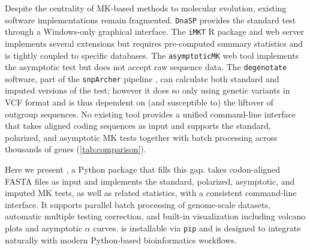 Despite the centrality of MK-based methods to molecular evolution,
existing software implementations remain fragmented.
\texttt{DnaSP} \citep{librado2009} provides the standard test
through a Windows-only graphical interface.
The \texttt{iMKT} R package and web server \citep{murga-moreno2019}
implements several extensions
but requires pre-computed summary statistics
and is tightly coupled to specific databases.
The \texttt{asymptoticMK} web tool \citep{haller2017}
implements the asymptotic test
but does not accept raw sequence data.
The \texttt{degenotate} software, part of the \texttt{snpArcher}
pipeline \cite{mirchandani2023}, can calculate both standard and 
imputed versions of the test; however it does so only using
genetic variants in VCF format and is thus dependent on
(and susceptible to) the liftover of outgroup sequences.
No existing tool provides a unified command-line interface
that takes aligned coding sequences as input
and supports the standard, polarized, and asymptotic MK tests
together with batch processing across thousands of genes
(\cref{tab:comparison}).

Here we present \mkado, a Python package that fills this gap.
\mkado takes codon-aligned FASTA files as input
and implements the standard, polarized, asymptotic,
and imputed MK tests,
as well as related statistics,
with a consistent command-line interface.
It supports parallel batch processing of genome-scale datasets,
automatic multiple testing correction,
and built-in visualization
including volcano plots and asymptotic $\alpha$ curves.
\mkado is installable via \texttt{pip}
and is designed to integrate naturally
with modern Python-based bioinformatics workflows.

